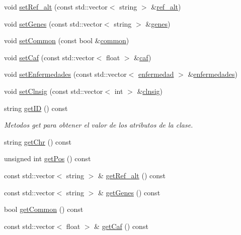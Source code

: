 \begin{DoxyCompactItemize}
\item 
void \hyperlink{classmutacion_af90752d5ce0e83943ea891ce995989f1}{set\-Ref\-\_\-alt} (const std\-::vector$<$ string $>$ \&\hyperlink{classmutacion_a2b3d0ed7547618562fae965d373b39e3}{ref\-\_\-alt})
\item 
void \hyperlink{classmutacion_a0cd370211bab4ae95120a68c57a92bed}{set\-Genes} (const std\-::vector$<$ string $>$ \&\hyperlink{classmutacion_af0048945b6062d6eb88b91db707993f6}{genes})
\item 
void \hyperlink{classmutacion_ab62d36e9bad78d43ace74fdaec909ca6}{set\-Common} (const bool \&\hyperlink{classmutacion_a6dabfef6167d64030f095887b15f65dd}{common})
\item 
void \hyperlink{classmutacion_a447b9009932a64b2ed6269ed2577f865}{set\-Caf} (const std\-::vector$<$ float $>$ \&\hyperlink{classmutacion_aef3fe46b6a2d10e3993703ebd5d5be5f}{caf})
\item 
void \hyperlink{classmutacion_a74da1d35cb0947b597ddf3b33e270d23}{set\-Enfermedades} (const std\-::vector$<$ \hyperlink{classenfermedad}{enfermedad} $>$ \&\hyperlink{classmutacion_ac8cca92dea1ab6fb9c193eed55a5ad28}{enfermedades})
\item 
void \hyperlink{classmutacion_aed8c1aedd3468bf27bafab931d576454}{set\-Clnsig} (const std\-::vector$<$ int $>$ \&\hyperlink{classmutacion_a0d029eee6925649df15081b780c12e37}{clnsig})
\item 
string \hyperlink{classmutacion_a6e3fa261f38b413aff9172fe065da8b8}{get\-I\-D} () const 
\begin{DoxyCompactList}\small\item\em Metodos get para obtener el valor de los atributos de la clase. \end{DoxyCompactList}\item 
string \hyperlink{classmutacion_aefb0a9a6a8278f0d192ebc044198399c}{get\-Chr} () const 
\item 
unsigned int \hyperlink{classmutacion_ad08cb3c30da4195adc3c22d0b4c8edd7}{get\-Pos} () const 
\item 
const std\-::vector$<$ string $>$ \& \hyperlink{classmutacion_a241c1c54950209830ea7762ce8d7da58}{get\-Ref\-\_\-alt} () const 
\item 
const std\-::vector$<$ string $>$ \& \hyperlink{classmutacion_a62462017a747cc19bf33abc3d5b69a8c}{get\-Genes} () const 
\item 
bool \hyperlink{classmutacion_abc353016535a561fbd8e902c83861228}{get\-Common} () const 
\item 
const std\-::vector$<$ float $>$ \& \hyperlink{classmutacion_a1eb523be88f47d1f4ef8324ca7016174}{get\-Caf} () const 

\end{DoxyCompactItemize}
